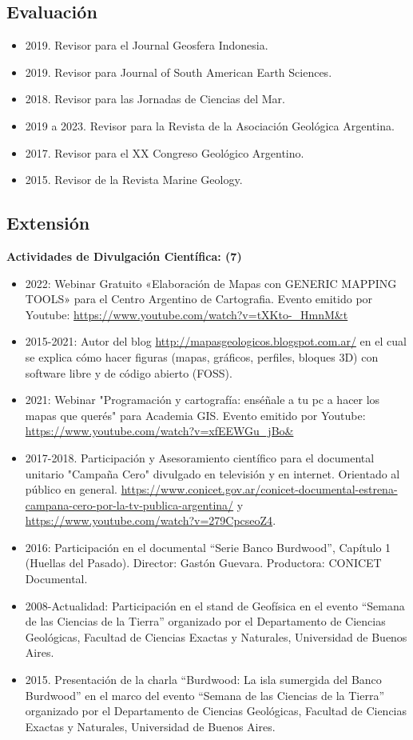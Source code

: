 \documentclass[11pt, a4paper]{article}
\begin{document}
\subsection{Evaluación}

\begin{itemize}
    \item 2019. Revisor para el Journal Geosfera Indonesia.
    \item 2019. Revisor para Journal of South American Earth Sciences.
    \item 2018. Revisor para las Jornadas de Ciencias del Mar.
    \item 2019 a 2023. Revisor para la Revista de la Asociación Geológica Argentina.
    \item 2017. Revisor para el XX Congreso Geológico Argentino.
    \item 2015. Revisor de la Revista Marine Geology.
\end{itemize}


\subsection{Extensión}

\textbf{Actividades de Divulgación Científica: (7)}

\begin{itemize}
    \item 2022: Webinar Gratuito «Elaboración de Mapas con GENERIC MAPPING TOOLS» para el Centro Argentino de Cartografia. Evento emitido por Youtube: \url{https://www.youtube.com/watch?v=tXKto-_HmnM&t}
    \item 2015-2021: Autor del blog \url{http://mapasgeologicos.blogspot.com.ar/} en el cual se explica cómo hacer figuras (mapas, gráficos, perfiles, bloques 3D) con software libre y de código abierto (FOSS).
    \item 2021: Webinar "Programación y cartografía: enséñale a tu pc a hacer los mapas que querés" para Academia GIS. Evento emitido por Youtube: \url{https://www.youtube.com/watch?v=xfEEWGu_jBo&}
    \item 2017-2018. Participación y Asesoramiento científico para el documental unitario "Campaña Cero" divulgado en televisión y en internet. Orientado al público en general. \url{https://www.conicet.gov.ar/conicet-documental-estrena-campana-cero-por-la-tv-publica-argentina/} y \url{https://www.youtube.com/watch?v=279CpcseoZ4}.
    \item 2016: Participación en el documental “Serie Banco Burdwood”, Capítulo 1 (Huellas del Pasado). Director: Gastón Guevara. Productora: CONICET Documental.
    \item 2008-Actualidad: Participación en el stand de Geofísica en el evento “Semana de las Ciencias de la Tierra” organizado por el Departamento de Ciencias Geológicas, Facultad de Ciencias Exactas y Naturales, Universidad de Buenos Aires.
    \item 2015. Presentación de la charla “Burdwood: La isla sumergida del Banco Burdwood” en el marco del evento “Semana de las Ciencias de la Tierra” organizado por el Departamento de Ciencias Geológicas, Facultad de Ciencias Exactas y Naturales, Universidad de Buenos Aires.
\end{itemize}
\end{document}
